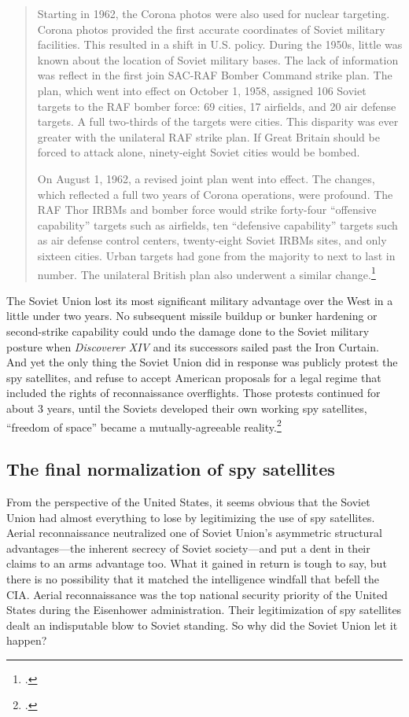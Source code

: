 \documentclass{memoir}
\begin{document}
\begin{quote}
Starting in 1962, the Corona photos were also used for nuclear targeting. Corona photos provided the first accurate coordinates of Soviet military facilities. This resulted in a shift in U.S. policy. During the 1950s, little was known about the location of Soviet military bases. The lack of information was reflect in the first join SAC-RAF Bomber Command strike plan. The plan, which went into effect on October 1, 1958, assigned 106 Soviet targets to the RAF bomber force: 69 cities, 17 airfields, and 20 air defense targets. A full two-thirds of the targets were cities. This disparity was ever greater with the unilateral RAF strike plan. If Great Britain should be forced to attack alone, ninety-eight Soviet cities would be bombed.

On August 1, 1962, a revised joint plan went into effect. The changes, which reflected a full two years of Corona operations, were profound. The RAF Thor IRBMs and bomber force would strike forty-four ``offensive capability'' targets such as airfields, ten ``defensive capability'' targets such as air defense control centers, twenty-eight Soviet IRBMs sites, and only sixteen cities. Urban targets had gone from the majority to next to last in number. The unilateral British plan also underwent a similar change.\footcite[p.~139]{peebles_corona_1997}
\end{quote}
The Soviet Union lost its most significant military advantage over the West in a little under two years. No subsequent missile buildup or bunker hardening or second-strike capability could undo the damage done to the Soviet military posture when \emph{Discoverer XIV} and its successors sailed past the Iron Curtain. And yet the only thing the Soviet Union did in response was publicly protest the spy satellites, and refuse to accept American proposals for a legal regime that included the rights of reconnaissance overflights. Those protests continued for about 3 years, until the Soviets developed their own working spy satellites, ``freedom of space'' became a mutually-agreeable reality.\footcite[p.~271-275]{mcdougall_heavens_1985}

\subsection{The final normalization of spy satellites}
From the perspective of the United States, it seems obvious that the Soviet Union had almost everything to lose by legitimizing the use of spy satellites. Aerial reconnaissance neutralized one of Soviet Union's asymmetric structural advantages---the inherent secrecy of Soviet society---and put a dent in their claims to an arms advantage too. What it gained in return is tough to say, but there is no possibility that it matched the intelligence windfall that befell the CIA. Aerial reconnaissance was the top national security priority of the United States during the Eisenhower administration. Their legitimization of spy satellites dealt an indisputable blow to Soviet standing. So why did the Soviet Union let it happen?
\end{document}

